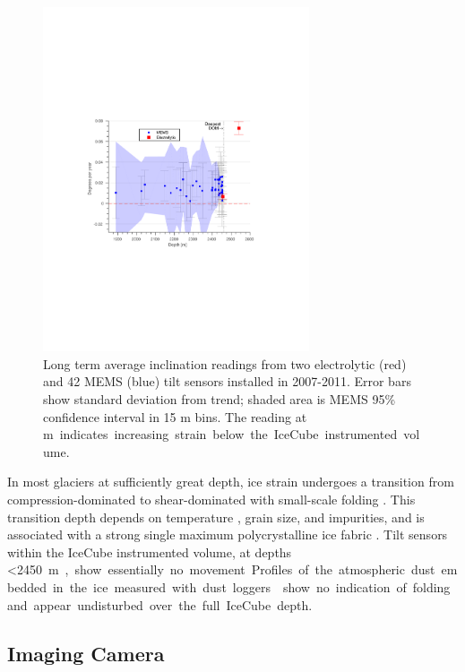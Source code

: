\begin{figure}[!ht]
	\centering
    \includegraphics[width=0.7\textwidth]{graphics/geometry/tilt4.pdf}
	\caption{Long term average inclination readings from two electrolytic
      (red) and 42 MEMS (blue) tilt sensors installed in 2007-2011.  Error
      bars show standard deviation from trend; shaded area is MEMS 95\%
      confidence interval in 15 m bins.  The reading at \unit[2540]m
      indicates increasing strain below the IceCube instrumented volume.}
	\label{fig:tilt}
\end{figure}

In most glaciers at sufficiently great depth, ice strain undergoes a
transition from compression-dominated to shear-dominated with small-scale
folding \cite{montagnat14,jansen16}.  This transition depth depends on
temperature \cite{price2002temperature}, grain size, and impurities, and is
associated with a strong single maximum polycrystalline ice fabric
\cite{cuffey10}.  Tilt sensors within the IceCube instrumented volume, at
depths \SI{<2450}m, show essentially no movement.  Profiles of the
atmospheric dust embedded in the ice measured with dust loggers \cite{I3:dustlogger} show no
indication of folding and appear undisturbed over the full IceCube depth.

\subsection{Imaging Camera}

